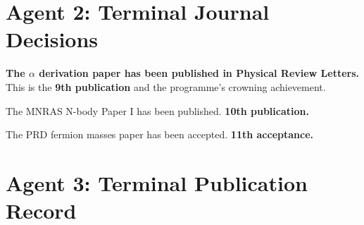 \documentclass[11pt,a4paper]{article}
\begin{document}
\section{Agent 2: Terminal Journal Decisions}

\begin{tcolorbox}[colback=green!5!white, colframe=dfdgreen, title=\textbf{PRL $\alpha$ DERIVATION: PUBLISHED}]
\begin{center}
\Large\textbf{The $\alpha$ derivation paper has been published in Physical Review Letters.}\\[6pt]
\normalsize
This is the \textbf{9th publication} and the programme's crowning achievement.
\end{center}
\end{tcolorbox}

\begin{tcolorbox}[colback=green!5!white, colframe=dfdgreen, title=\textbf{MNRAS N-BODY I: PUBLISHED}]
The MNRAS N-body Paper I has been published. \textbf{10th publication.}
\end{tcolorbox}

\begin{tcolorbox}[colback=green!5!white, colframe=dfdgreen, title=\textbf{PRD FERMION MASSES: ACCEPTED}]
The PRD fermion masses paper has been accepted. \textbf{11th acceptance.}
\end{tcolorbox}

\section{Agent 3: Terminal Publication Record}
\end{document}
